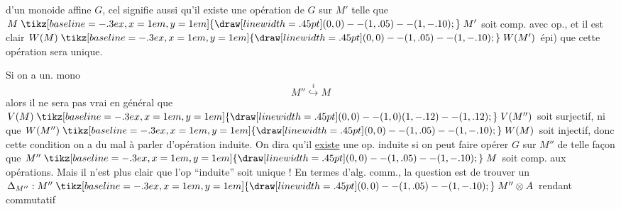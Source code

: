 d'un monoide affine $G$, cel signifie aussi qu'il existe une opération de $G$ sur $M'$  telle que $M\mathrel{\tikz[baseline=-.3ex,x=1em,y=1em]{\draw[line width=.45pt] (0,0)--(1,.05)--(1,-.10);}}M'$ soit comp. avec  op., et il est clair  $W(M)\mathrel{\tikz[baseline=-.3ex,x=1em,y=1em]{\draw[line width=.45pt] (0,0)--(1,.05)--(1,-.10);}}W(M')$ épi) que cette opération sera unique.

Si on a un. mono
\[
M''\overset{i}{\hookrightarrow}M
\]
alors il ne sera pas vrai en général que $V(M)\mathrel{\tikz[baseline=-.3ex,x=1em,y=1em]{\draw[line width=.45pt] (0,0)--(1,0) (1,-.12)--(1,.12);}}V(M'')$ soit surjectif, ni que $W(M'')\mathrel{\tikz[baseline=-.3ex,x=1em,y=1em]{\draw[line width=.45pt] (0,0)--(1,.05)--(1,-.10);}}W(M)$ soit injectif, donc  cette condition on a du mal à parler d'opération induite.
 On dira qu'il \uline{existe} une op. induite si on peut faire opérer $G$ sur $M''$ de telle façon que $M''\mathrel{\tikz[baseline=-.3ex,x=1em,y=1em]{\draw[line width=.45pt] (0,0)--(1,.05)--(1,-.10);}}M$ soit comp. aux opérations.
Mais il n'est plus clair que l'op ``induite'' soit unique ! En termes d'alg. comm., la question est de trouver un $\Delta_{M''}:M''\mathrel{\tikz[baseline=-.3ex,x=1em,y=1em]{\draw[line width=.45pt] (0,0)--(1,.05)--(1,-.10);}}M''\otimes A$ rendant commutatif

